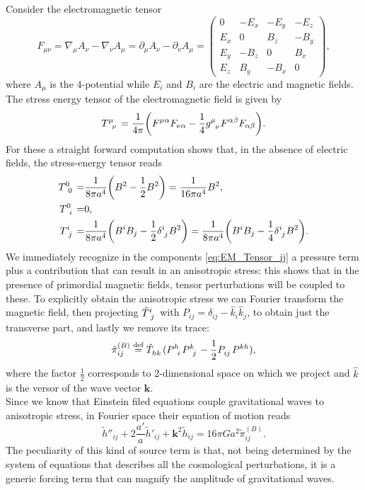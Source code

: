 Consider the electromagnetic tensor 
$$F_{\mu\nu}= \nabla_\mu A_\nu - \nabla_\nu A_\mu=\partial_\mu A_\nu-\partial_\nu A_\mu=\begin{pmatrix}
    0 & -E_x & -E_y & -E_z \\
    E_x & 0 & B_z & -B_y \\
    E_y & -B_z & 0 & B_x \\
    E_z & B_y & -B_x & 0
\end{pmatrix},$$
where $A_\mu$ is the 4-potential while $E_i$ and $B_i$ are the electric and magnetic fields. The stress energy tensor of the electromagnetic field is given by 
$$
\tensor{T}{^\mu_\nu}=\frac{1}{4\pi}\bigg(F^{\mu\alpha}F_{\nu\alpha}-\frac{1}{4}\tensor{g}{^\mu_\nu} F^{\alpha\beta}F_{\alpha\beta}\bigg).
$$
For these a straight forward computation shows that, in the absence of electric fields, the stress-energy tensor reads
\begin{subequations}
    \begin{align}
    \tensor{T}{^0_0}=&\frac{1}{8\pi a^4}\bigg(B^2-\frac{1}{2}B^2\bigg)=\frac{1}{16\pi a^4}B^2,\label{eq:EM_Tensor_00}\\
    \tensor{T}{^0_i}=&0\label{eq:EM_Tensor_0i},\\
    \tensor{T}{^i_j}=&\frac{1}{8\pi a^4}\bigg(B^iB_j-\frac{1}{2}\tensor{\delta}{^i_j} B^2\bigg)=\frac{1}{8\pi a^4}\bigg(B^iB_j-\frac{1}{4}\tensor{\delta}{^i_j} B^2\bigg).\label{eq:EM_Tensor_ij}
\end{align}
\end{subequations}
We immediately recognize in the components \eqref{eq:EM_Tensor_ij} a pressure term plus a contribution that can result in an anisotropic stress: this shows that in the presence of primordial magnetic fields, tensor perturbations will be coupled to these. To explicitly obtain the anisotropic stress we can Fourier transform the magnetic field, then projecting $\tensor{\tilde T}{^i_j}$ with $P_{ij}=\delta_{ij}-\hat k_i\hat k_j$, to obtain just the transverse part, and lastly we remove its trace:
$$\tilde\pi_{ij}^{(B)}\defeq\tensor{\tilde T}{_h_k}(\tensor{P}{^h_i}\tensor{P}{^k_j}-\frac{1}{2}\tensor{P}{_i_j}\tensor{P}{^k^h}),$$
where the factor $\tfrac12$ corresponds to 2-dimensional space on which we project and $\hat{k}$ is the versor of the wave vector $\mathbf{k}$.\\
Since we know that Einstein filed equations couple gravitational waves to anisotropic stress, in Fourier space their equation of motion reads
\begin{equation}
     \tilde h''_{ij}+2\frac{a'}{a}\tilde h'_{ij}+\boldsymbol{k}^2 \tilde h_{ij}=16\pi G a^2\tilde\pi^{(B)}_{ij}.
\end{equation}
The peculiarity of this kind of source term is that, not being determined by the system of equations that describes all the cosmological perturbations, it is a generic forcing term that can magnify the amplitude of gravitational waves. 

